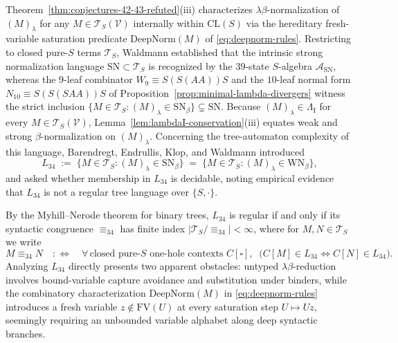 \documentclass[11pt,reqno]{amsart}
\numberwithin{equation}{section}
\theoremstyle{plain}
\theoremstyle{definition}
\theoremstyle{remark}
\newcommand{\CLS}{\mathrm{CL}(S)}
\newcommand{\TS}{\mathcal{T}_S}
\newcommand{\TSV}{\mathcal{T}_S(\mathcal{V})}
\newcommand{\SN}{\mathrm{SN}}
\newcommand{\WN}{\mathrm{WN}}
\begin{document}
Theorem~\ref{thm:conjectures-42-43-refuted}(iii) characterizes $\lambda\beta$-normalization of $(M)_\lambda$ for any $M \in \TSV$ internally within $\CLS$ via the hereditary fresh-variable saturation predicate $\mathrm{DeepNorm}(M)$ of \eqref{eq:deepnorm-rules}. Restricting to closed pure-$S$ terms $\TS$, Waldmann \cite{Waldmann2000} established that the intrinsic strong normalization language $\SN \subset \TS$ is recognized by the $39$-state $S$-algebra $\mathcal{A}_{\SN}$, whereas the $9$-leaf combinator $W_9 \equiv S(S(A A))S$ and the $10$-leaf normal form $N_{10} \equiv S(S(S A A))S$ of Proposition~\ref{prop:minimal-lambda-divergers} witness the strict inclusion $\{M \in \TS : (M)_\lambda \in \SN_\beta\} \subsetneq \SN$. Because $(M)_\lambda \in \Lambda_{\mathrm{I}}$ for every $M \in \TSV$, Lemma~\ref{lem:lambdaI-conservation}(iii) equates weak and strong $\beta$-normalization on $(M)_\lambda$. Concerning the tree-automaton complexity of this language, Barendregt, Endrullis, Klop, and Waldmann \cite[Question~34, p.~96]{BarendregtEndrullisKlopWaldmann2017} introduced
\begin{equation}\label{eq:l34-def}
  L_{34} \;:=\; \bigl\{M \in \TS : (M)_\lambda \in \SN_\beta\bigr\} \;=\; \bigl\{M \in \TS : (M)_\lambda \in \WN_\beta\bigr\},
\end{equation}
and asked whether membership in $L_{34}$ is decidable, noting empirical evidence that $L_{34}$ is not a regular tree language over $\{S, \cdot\}$.

By the Myhill--Nerode theorem for binary trees, $L_{34}$ is regular if and only if its syntactic congruence $\equiv_{34}$ has finite index $|\TS / {\equiv_{34}}| < \infty$, where for $M, N \in \TS$ we write
\begin{equation}\label{eq:equiv34-def}
  M \equiv_{34} N \quad:\Longleftrightarrow\quad \forall\,\text{closed pure-$S$ one-hole contexts } C[\square],\;\; \bigl(C[M] \in L_{34} \iff C[N] \in L_{34}\bigr).
\end{equation}
Analyzing $L_{34}$ directly presents two apparent obstacles: untyped $\lambda\beta$-reduction involves bound-variable capture avoidance and substitution under binders, while the combinatory characterization $\mathrm{DeepNorm}(M)$ in \eqref{eq:deepnorm-rules} introduces a fresh variable $z \notin \mathrm{FV}(U)$ at every saturation step $U \mapsto U z$, seemingly requiring an unbounded variable alphabet along deep syntactic branches.
\end{document}
